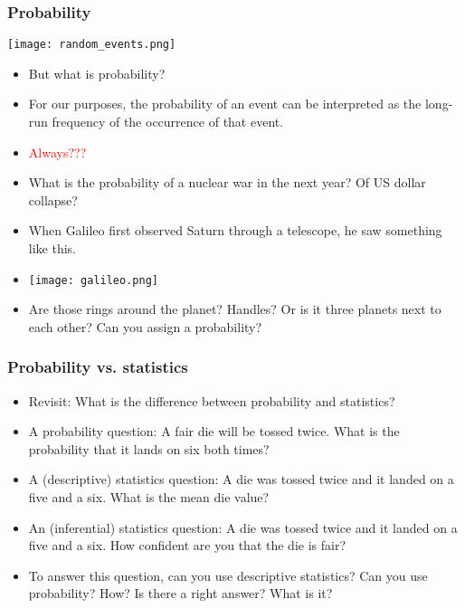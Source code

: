 \documentclass[xcolor=dvipsnames, 9pt]{beamer} %
\begin{document}
\begin{frame}
\frametitle{Probability}
\vspace{-1em}
\begin{center}
\texttt{[image: random\_events.png]}
\end{center}
\begin{small}
\vspace{-2em}
\begin{itemize}
	\setlength\itemsep{1em}
	\item But what is probability? 
	\item For our purposes, the probability of an event can be interpreted as the long-run frequency of the occurrence of that event. 
	\item \textcolor{red}{Always???} 
	\item What is the probability of a nuclear war in the next year? Of US dollar collapse? 
	\item When Galileo first observed Saturn through a telescope, he saw something like this. 
	\item[] \begin{center}
	\vspace{-0.5cm}
\texttt{[image: galileo.png]}
\end{center}
	\item Are those rings around the planet? Handles? Or is it three planets next to each other? Can you assign a probability? 
\end{itemize}
\end{small}
\end{frame}

\begin{frame}
\frametitle{Probability vs. statistics}
\begin{itemize}
	\setlength\itemsep{1em}
	\item Revisit: What is the difference between probability and statistics?
	\item A probability question: A \textcolor{dark_red}{fair} die will be tossed twice. What is the probability that it lands on six both times? 
	\item A (descriptive) statistics question: A die was tossed twice and it landed on a five and a six. What is the mean die value? 
	\item An (inferential) statistics question: A die was tossed twice and it landed on a five and a six. How confident are you that the die is \textcolor{dark_red}{fair}? 
	\item To answer this question, can you use descriptive statistics? Can you use probability? How? Is there a right answer? What is it? 
\end{itemize}
\end{frame}
\end{document}
